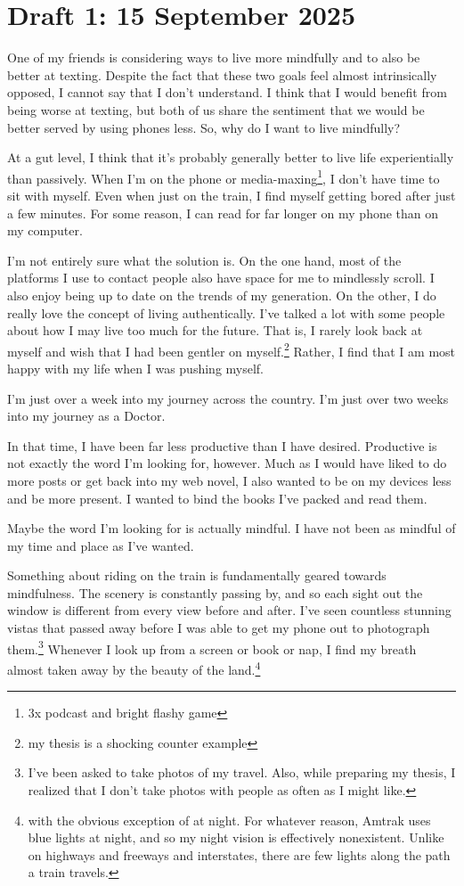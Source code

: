 \documentclass[12pt]{article}
\renewcommand{\,}{\textsuperscript{,}}
\begin{document}
\section{Draft 1: 15 September 2025}
One of my friends is considering ways to live more mindfully and to also be better at texting.
Despite the fact that these two goals feel almost intrinsically opposed, I cannot say that I don't understand.
I think that I would benefit from being worse at texting, but both of us share the sentiment that we would be better served by using phones less.
So, why do I want to live mindfully?

At a gut level, I think that it's probably generally better to live life experientially than passively.
When I'm on the phone or media-maxing\footnote{3x podcast and bright flashy game}, I don't have time to sit with myself.
Even when just on the train, I find myself getting bored after just a few minutes.
For some reason, I can read for far longer on my phone than on my computer.

I'm not entirely sure what the solution is.
On the one hand, most of the platforms I use to contact people also have space for me to mindlessly scroll.
I also enjoy being up to date on the trends of my generation.
On the other, I do really love the concept of living authentically.
I've talked a lot with some people about how I may live too much for the future.
That is, I rarely look back at myself and wish that I had been gentler on myself.\footnote{my thesis is a shocking counter example}
Rather, I find that I am most happy with my life when I was pushing myself.

I'm just over a week into my journey across the country.
I'm just over two weeks into my journey as a Doctor.

In that time, I have been far less productive than I have desired.
Productive is not exactly the word I'm looking for, however.
Much as I would have liked to do more posts or get back into my web novel, I also wanted to be on my devices less and be more present.
I wanted to bind the books I've packed and read them.

Maybe the word I'm looking for is actually mindful.
I have not been as mindful of my time and place as I've wanted.

Something about riding on the train is fundamentally geared towards mindfulness.
The scenery is constantly passing by, and so each sight out the window is different from every view before and after.
I've seen countless stunning vistas that passed away before I was able to get my phone out to photograph them.\footnote{I've been asked to take photos of my travel. Also, while preparing my thesis, I realized that I don't take photos with people as often as I might like.}
Whenever I look up from a screen or book or nap, I find my breath almost taken away by the beauty of the land.\footnote{with the obvious exception of  at night. For whatever reason, Amtrak uses blue lights at night, and so my night vision is effectively nonexistent.
Unlike on highways and freeways and interstates, there are few lights along the path a train travels.}
\end{document}
